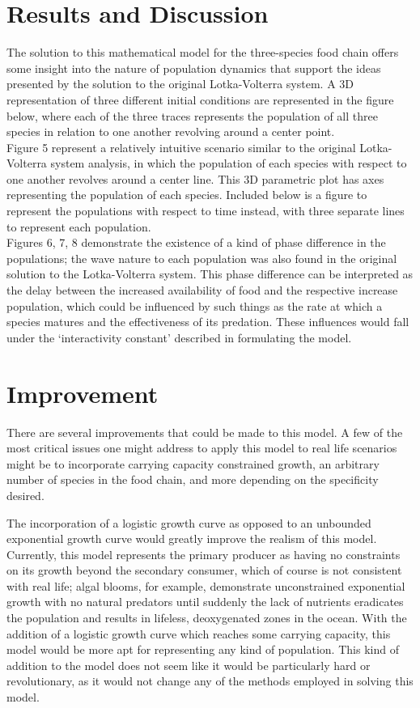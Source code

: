 \documentclass[11pt,oneside]{article}
\begin{document}
	\section{Results and Discussion}
	The solution to this mathematical model for the three-species food chain offers some insight into the nature of population dynamics that support the ideas presented by the solution to the original Lotka-Volterra system. A 3D representation of  three different initial conditions are represented in the figure below, where each of the three traces represents the population of all three species in relation to one another revolving around a center point.\\
	
	Figure 5 represent a relatively intuitive scenario similar to the original Lotka-Volterra system analysis, in which the population of each species with respect to one another revolves around a center line. This 3D parametric plot has axes representing the population of each species. Included below is a figure to represent the populations with respect to time instead, with three separate lines to represent each population.\\
	
	Figures 6, 7, 8 demonstrate the existence of a kind of phase difference in the populations; the wave nature to each population was also found in the original solution to the Lotka-Volterra system. This phase difference can be interpreted as the delay between the increased availability of food and the respective increase population, which could be influenced by such things as the rate at which a species matures and the effectiveness of its predation. These influences would fall under the `interactivity constant' described in formulating the model.
	
	
	\section{Improvement}
	There are several improvements that could be made to this model. A few of the most critical issues one might address to apply this model to real life scenarios might be to incorporate carrying capacity constrained growth, an arbitrary number of species in the food chain, and more depending on the specificity desired.
	
	The incorporation of a logistic growth curve as opposed to an unbounded exponential growth curve would greatly improve the realism of this model. Currently, this model represents the primary producer as having no constraints on its growth beyond the secondary consumer, which of course is not consistent with real life; algal blooms, for example, demonstrate unconstrained exponential growth with no natural predators until suddenly the lack of nutrients eradicates the population and results in lifeless, deoxygenated zones in the ocean. With the addition of a logistic growth curve which reaches some carrying capacity, this model would be more apt for representing any kind of population. This kind of addition to the model does not seem like it would be particularly hard or revolutionary, as it would not change any of the methods employed in solving this model.
	
\end{document}
